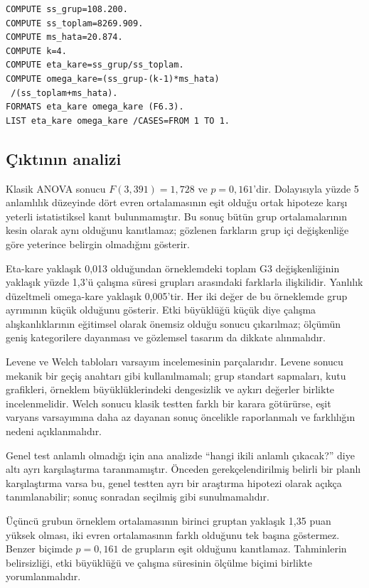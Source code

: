 \begin{lstlisting}[language={}]
COMPUTE ss_grup=108.200.
COMPUTE ss_toplam=8269.909.
COMPUTE ms_hata=20.874.
COMPUTE k=4.
COMPUTE eta_kare=ss_grup/ss_toplam.
COMPUTE omega_kare=(ss_grup-(k-1)*ms_hata)
 /(ss_toplam+ms_hata).
FORMATS eta_kare omega_kare (F6.3).
LIST eta_kare omega_kare /CASES=FROM 1 TO 1.
\end{lstlisting}

\subsection{Çıktının analizi}

Klasik ANOVA sonucu $F(3,391)=1{,}728$ ve $p=0{,}161$'dir. Dolayısıyla yüzde
5 anlamlılık düzeyinde dört evren ortalamasının eşit olduğu ortak hipoteze
karşı yeterli istatistiksel kanıt bulunmamıştır. Bu sonuç bütün grup
ortalamalarının kesin olarak aynı olduğunu kanıtlamaz; gözlenen farkların grup
içi değişkenliğe göre yeterince belirgin olmadığını gösterir.

Eta-kare yaklaşık 0,013 olduğundan örneklemdeki toplam G3 değişkenliğinin
yaklaşık yüzde 1,3'ü çalışma süresi grupları arasındaki farklarla ilişkilidir.
Yanlılık düzeltmeli omega-kare yaklaşık 0,005'tir. Her iki değer de bu
örneklemde grup ayrımının küçük olduğunu gösterir. Etki büyüklüğü küçük diye
çalışma alışkanlıklarının eğitimsel olarak önemsiz olduğu sonucu çıkarılmaz;
ölçümün geniş kategorilere dayanması ve gözlemsel tasarım da dikkate
alınmalıdır.

Levene ve Welch tabloları varsayım incelemesinin parçalarıdır. Levene sonucu
mekanik bir geçiş anahtarı gibi kullanılmamalı; grup standart sapmaları, kutu
grafikleri, örneklem büyüklüklerindeki dengesizlik ve aykırı değerler birlikte
incelenmelidir. Welch sonucu klasik testten farklı bir karara götürürse,
eşit varyans varsayımına daha az dayanan sonuç öncelikle raporlanmalı ve
farklılığın nedeni açıklanmalıdır.

Genel test anlamlı olmadığı için ana analizde ``hangi ikili anlamlı çıkacak?''
diye altı ayrı karşılaştırma taranmamıştır. Önceden gerekçelendirilmiş belirli
bir planlı karşılaştırma varsa bu, genel testten ayrı bir araştırma hipotezi
olarak açıkça tanımlanabilir; sonuç sonradan seçilmiş gibi sunulmamalıdır.

\begin{mistakebox}
Üçüncü grubun örneklem ortalamasının birinci gruptan yaklaşık 1,35 puan yüksek
olması, iki evren ortalamasının farklı olduğunu tek başına göstermez. Benzer
biçimde $p=0{,}161$ de grupların eşit olduğunu kanıtlamaz. Tahminlerin
belirsizliği, etki büyüklüğü ve çalışma süresinin ölçülme biçimi birlikte
yorumlanmalıdır.
\end{mistakebox}

